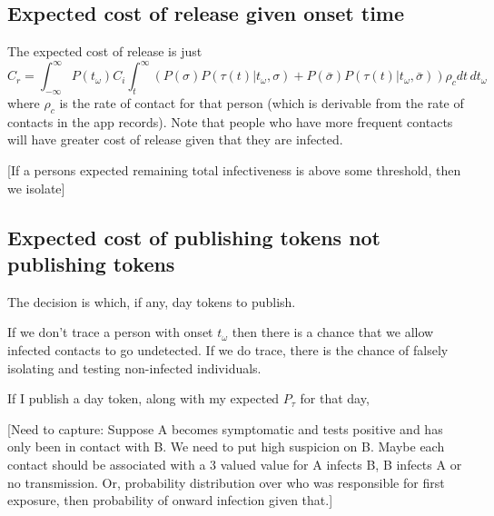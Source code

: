 \documentclass{article}
\begin{document}
\subsection{Expected cost of release given onset time}

The expected cost of release is just
\[
C_r = \int_{-\infty}^{\infty} P(t_\omega) C_i\int_t^{\infty} \left(P(\sigma)P(\tau(t)|t_\omega,\sigma) + P(\bar{\sigma})P(\tau(t)|t_\omega,\bar{\sigma})\right)\rho_c dt \, dt_\omega
\]
where $\rho_c$ is the rate of contact for that person (which is derivable from the rate of contacts in the app records). Note that people who have more frequent contacts will have greater cost of release given that they are infected.

[If a persons expected remaining total infectiveness is above some threshold, then we isolate]

\subsection{Expected cost of publishing tokens not publishing tokens}

The decision is which, if any, day tokens to publish.

If we don't trace a person with onset $t_\omega$ then there is a chance that we allow infected contacts to go undetected. If we do trace, there is the chance of falsely isolating and testing non-infected individuals.

If I publish a day token, along with my expected $P_\tau$ for that day, 


[Need to capture: Suppose A becomes symptomatic and tests positive and has only been in contact with B. We need to put high suspicion on B. Maybe each contact should be associated with a 3 valued value for A infects B, B infects A or no transmission. Or, probability distribution over who was responsible for first exposure, then probability of onward infection given that.]

%

%
%
% 
%

\end{document}
